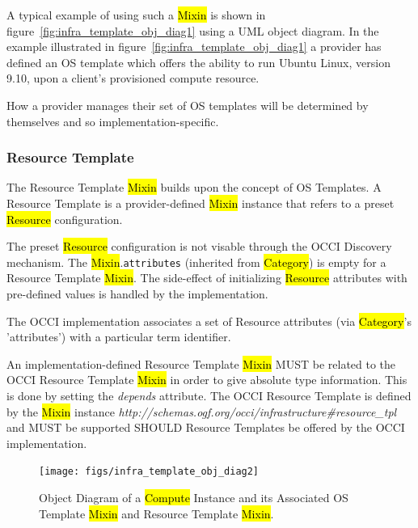 \documentclass[10pt,a4paper]{article}
\begin{document}

A typical example of using such a \hl{Mixin} is shown in
figure~\ref{fig:infra_template_obj_diag1} using a UML object diagram.
In the example illustrated in
figure~\ref{fig:infra_template_obj_diag1} a provider has defined an OS
template which offers the ability to run Ubuntu Linux, version 9.10,
upon a client's provisioned compute resource.

How a provider manages their set of OS templates will be determined by
themselves and so implementation-specific.

\subsubsection{Resource Template}
The Resource Template \hl{Mixin} builds upon the concept of OS
Templates. A Resource Template is a provider-defined \hl{Mixin}
instance that refers to a preset \hl{Resource} configuration.

The preset \hl{Resource} configuration is not visable through the OCCI
Discovery mechanism. The \hl{Mixin}.{\tt attributes} (inherited from
\hl{Category}) is empty for a Resource Template \hl{Mixin}.  The
side-effect of initializing \hl{Resource} attributes with pre-defined
values is handled by the implementation.

The OCCI implementation associates a set of Resource attributes (via
\hl{Category}'s 'attributes') with a particular term identifier.

An implementation-defined Resource Template \hl{Mixin} MUST be related
to the OCCI Resource Template \hl{Mixin} in order to give absolute
type information. This is done by setting the \textit{depends} attribute.
The OCCI Resource Template is defined by the
\hl{Mixin} instance
\textit{http://schemas.ogf.org/occi/infrastructure\#resource\_tpl} and
MUST be supported SHOULD Resource Templates be offered by the OCCI
implementation.

\begin{figure}[!h]
	\centering
	\texttt{[image: figs/infra\_template\_obj\_diag2]}
	\caption{Object Diagram of a \hl{Compute} Instance and its Associated OS Template
	\hl{Mixin} and Resource Template \hl{Mixin}.}
	\label{fig:infra_template_obj_diag2}
\end{figure}
\end{document}

